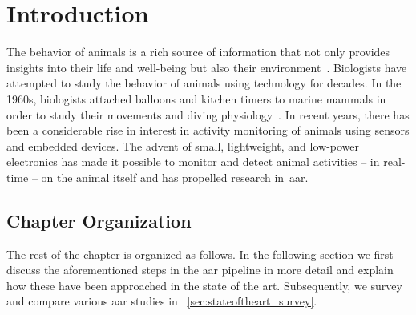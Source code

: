 \section{Introduction}


The behavior of animals is a rich source of information that not only provides insights into their life and well-being but also their environment~\cite{Sahin2007,Petersen2002,FirmatBanzi2014,Nathan2008}.
Biologists have attempted to study the behavior of animals using technology for decades.
In the 1960s, biologists attached balloons and kitchen timers to marine mammals in order to study their movements and diving physiology~\cite{Wilmers2015}. 
In recent years, there has been a considerable rise in interest in activity monitoring of animals using sensors and embedded devices. 
The advent of small, lightweight, and low-power electronics has made it possible to monitor and detect animal activities -- in real-time -- on the animal itself and has propelled research in~\gls{aar}.

\subsection{Chapter Organization}

The rest of the chapter is organized as follows.
In the following section we first discuss the aforementioned steps in the \gls{aar} pipeline in more detail and explain how these have been approached in the state of the art.
Subsequently, we survey and compare various \gls{aar} studies in \sectionname~\ref{sec:stateoftheart_survey}. 

